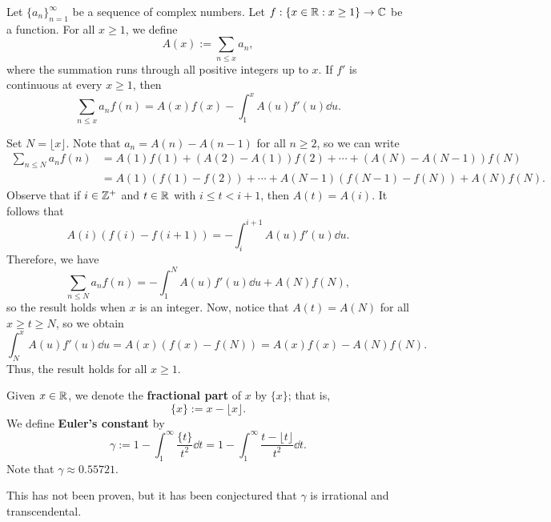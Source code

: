 \begin{lemma}
Let $\{a_n\}_{n=1}^\infty$ be a sequence of complex numbers. 
Let $f : \{x \in \mathbb{R} : x \geq 1\} \to \mathbb{C}$ be a function. 
For all $x \geq 1$, we define 
\[ A(x) := \sum_{n\leq x} a_n, \]
where the summation runs through all positive integers up to 
$x$. If $f'$ is continuous at every $x \geq 1$, then 
\[ \sum_{n\leq x} a_n f(n) = A(x) f(x) - \int_1^x A(u)f'(u)\dd u. \]
\end{lemma}
\begin{pf}
Set $N = \lfloor x \rfloor$. Note that 
$a_n = A(n) - A(n-1)$ for all $n \geq 2$, so we can write 
\begin{align*}
    \sum_{n\leq N} a_n f(n) &= A(1)f(1) + 
    (A(2) - A(1))f(2) + \cdots + (A(N) - A(N-1)) f(N) \\
    &= A(1)(f(1) - f(2)) + \cdots + A(N-1)(f(N-1) - f(N)) + A(N)f(N).
\end{align*}
Observe that if $i \in \mathbb{Z}^+$ and $t \in \mathbb{R}$ with $i \leq t < i+1$, then $A(t) = A(i)$. 
It follows that 
\[ A(i) (f(i) - f(i+1)) = -\int_i^{i+1} A(u) f'(u)\dd u. \]
Therefore, we have 
\[ \sum_{n\leq N} a_n f(n) = -\int_1^N A(u)f'(u)\dd u + 
A(N)f(N), \]
so the result holds when $x$ is an integer. Now, notice that 
$A(t) = A(N)$ for all $x \geq t \geq N$, so we obtain 
\[ \int_N^x A(u) f'(u)\dd u = A(x)(f(x) - f(N)) = 
A(x)f(x) - A(N)f(N). \]
Thus, the result holds for all $x \geq 1$.
\end{pf}

\begin{defn}
Given $x \in \mathbb{R}$, we denote the {\bf fractional part} of 
$x$ by $\{x\}$; that is, 
\[ \{x\} := x - \lfloor x \rfloor. \]
We define {\bf Euler's constant} by 
\[ \gamma := 1 - \int_1^\infty \frac{\{t\}}{t^2}\dd t 
= 1 - \int_1^\infty \frac{t - \lfloor t \rfloor}{t^2}\dd t. \]
Note that $\gamma \approx 0.55721$. 
\end{defn}

This has not been proven, but it has been conjectured that 
$\gamma$ is irrational and transcendental.

